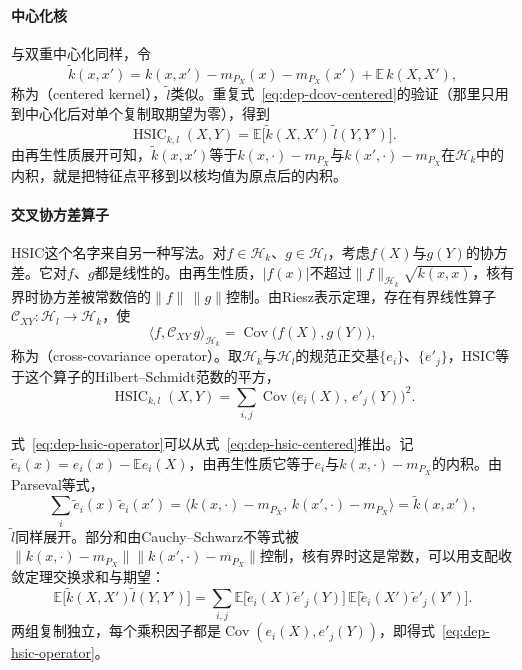 \paragraph{中心化核}
与双重中心化同样，令
\[
  \tilde{k}(x,x')=k(x,x')-m_{P_X}(x)-m_{P_X}(x')+\mathbb{E}\,k(X,X'),
\]
称为（centered kernel），$\tilde{l}$类似。重复式~\eqref{eq:dep-dcov-centered}的验证（那里只用到中心化后对单个复制取期望为零），得到
\begin{equation}
  \operatorname{HSIC}_{k,l}(X,Y)=\mathbb{E}\bigl[\tilde{k}(X,X')\,\tilde{l}(Y,Y')\bigr].
  \label{eq:dep-hsic-centered}
\end{equation}
由再生性质展开可知，$\tilde{k}(x,x')$等于$k(x,\cdot)-m_{P_X}$与$k(x',\cdot)-m_{P_X}$在$\mathcal{H}_k$中的内积，就是把特征点平移到以核均值为原点后的内积。

\paragraph{交叉协方差算子}
HSIC这个名字来自另一种写法。对$f\in\mathcal{H}_k$、$g\in\mathcal{H}_l$，考虑$f(X)$与$g(Y)$的协方差。它对$f$、$g$都是线性的。由再生性质，$\lvert f(x)\rvert$不超过$\lVert f\rVert_{\mathcal{H}_k}\sqrt{k(x,x)}$，核有界时协方差被常数倍的$\lVert f\rVert\,\lVert g\rVert$控制。由Riesz表示定理，存在有界线性算子$\mathcal{C}_{XY}:\mathcal{H}_l\to\mathcal{H}_k$，使
\[
  \langle f,\mathcal{C}_{XY}\,g\rangle_{\mathcal{H}_k}=\operatorname{Cov}\bigl(f(X),g(Y)\bigr),
\]
称为（cross-covariance operator）。取$\mathcal{H}_k$与$\mathcal{H}_l$的规范正交基$\{e_i\}$、$\{e'_j\}$，HSIC等于这个算子的Hilbert--Schmidt范数的平方，
\begin{equation}
  \operatorname{HSIC}_{k,l}(X,Y)=\sum_{i,j}\operatorname{Cov}\bigl(e_i(X),\,e'_j(Y)\bigr)^{2}.
  \label{eq:dep-hsic-operator}
\end{equation}

式~\eqref{eq:dep-hsic-operator}可以从式~\eqref{eq:dep-hsic-centered}推出。记$\tilde{e}_i(x)=e_i(x)-\mathbb{E}e_i(X)$，由再生性质它等于$e_i$与$k(x,\cdot)-m_{P_X}$的内积。由Parseval等式，
\[
  \sum_i\tilde{e}_i(x)\,\tilde{e}_i(x')=\bigl\langle k(x,\cdot)-m_{P_X},\,k(x',\cdot)-m_{P_X}\bigr\rangle=\tilde{k}(x,x'),
\]
$\tilde{l}$同样展开。部分和由Cauchy--Schwarz不等式被$\lVert k(x,\cdot)-m_{P_X}\rVert\lVert k(x',\cdot)-m_{P_X}\rVert$控制，核有界时这是常数，可以用支配收敛定理交换求和与期望：
\[
  \mathbb{E}\bigl[\tilde{k}(X,X')\tilde{l}(Y,Y')\bigr]=\sum_{i,j}\mathbb{E}\bigl[\tilde{e}_i(X)\tilde{e}'_j(Y)\bigr]\,\mathbb{E}\bigl[\tilde{e}_i(X')\tilde{e}'_j(Y')\bigr].
\]
两组复制独立，每个乘积因子都是$\operatorname{Cov}(e_i(X),e'_j(Y))$，即得式~\eqref{eq:dep-hsic-operator}。

